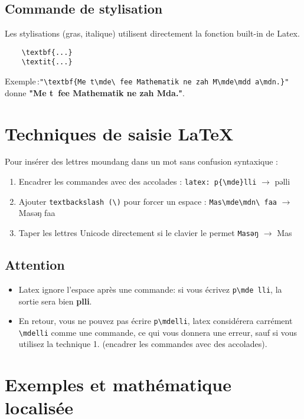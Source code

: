 \documentclass[a4paper,12pt]{article}
\begin{document}
\subsection{Commande de stylisation}
Les stylisations (gras, italique) utilisent directement la fonction built-in de Latex.
\begin{verbatim}
	\textbf{...}
	\textit{...}
\end{verbatim}
Exemple :\verb|"\textbf{Me t\mde\ fee Mathematik ne zah M\mde\mdd a\mdn.}"| donne
\textbf{"Me t\mde\ fee Mathematik ne zah M\mde da\mdn."}.

\section{Techniques de saisie LaTeX}
Pour insérer des lettres moundang dans un mot sans confusion syntaxique :
\begin{enumerate} 
	\item Encadrer les commandes avec des accolades : \verb|latex: p{\mde}lli| $\to$ pəlli 
	\item Ajouter \verb|textbackslash (\)| pour forcer un espace : \verb|Mas\mde\mdn\ faa| $\to$ Masəŋ faa
	 \item  Taper les lettres Unicode directement si le clavier le permet \verb|Masəŋ| $\to$ Mas\mde\mdn 
	 \end{enumerate}
\subsection*{Attention}
\begin{itemize}
	\item Latex ignore l'espace après une commande: si vous écrivez \verb|p\mde lli|, la sortie sera bien \textbf{p\mde lli}.
	\item En retour, vous ne pouvez pas écrire \verb|p\mdelli|, latex considérera carrément \verb|\mdelli| comme une commande, ce qui vous donnera une erreur, sauf si vous utilisez la technique 1. (encadrer les commandes avec des accolades).
\end{itemize}

\section{Exemples et mathématique localisée}
\end{document}
